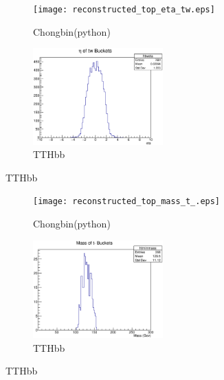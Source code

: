 \documentclass{beamer}
\begin{document}
\begin{frame}
  \begin{figure}[!h]
  \captionsetup[subfigure]{labelformat=empty}
  \begin{subfigure}{.5\textwidth}
  \centering
  \texttt{[image: reconstructed\_top\_eta\_tw.eps]}
  \caption{Chongbin(python)}
  \end{subfigure} \hfill
  \begin{subfigure}{.5\textwidth}
  \centering
  \includegraphics[width=5cm]{htweta_alljetregion.eps}
  \caption{TTHbb}
  \end{subfigure}
  \end{figure}
\end{frame}

\begin{frame}
  \begin{figure}[!h]
  \captionsetup[subfigure]{labelformat=empty}
  \begin{subfigure}{.5\textwidth}
  \centering
  \texttt{[image: reconstructed\_top\_mass\_t\_.eps]}
  \caption{Chongbin(python)}
  \end{subfigure} \hfill
  \begin{subfigure}{.5\textwidth}
  \centering
  \includegraphics[width=5cm]{htminmass_alljetregion.eps}
  \caption{TTHbb}
  \end{subfigure}
  \end{figure}
\end{frame}
\end{document}
